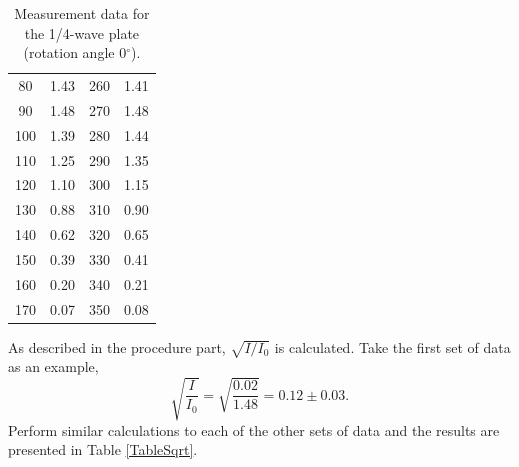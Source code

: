 \documentclass[a4paper]{article}
\begin{document}
\begin{table}[H]
\begin{tabular}{cc||cc}
		80                                                 & 1.43                                           & 260                                & 1.41                                           \\
		90                                                 & 1.48                                           & 270                                & 1.48                                           \\
		100                                                & 1.39                                           & 280                                & 1.44                                           \\
		110                                                & 1.25                                           & 290                                & 1.35                                           \\
		120                                                & 1.10                                           & 300                                & 1.15                                           \\
		130                                                & 0.88                                           & 310                                & 0.90                                           \\
		140                                                & 0.62                                           & 320                                & 0.65                                           \\
		150                                                & 0.39                                           & 330                                & 0.41                                           \\
		160                                                & 0.20                                           & 340                                & 0.21                                           \\
		170                                                & 0.07                                           & 350                                & 0.08                                           \\
		\hline
	\end{tabular}
	\caption{Measurement data for the 1/4-wave plate (rotation angle 0$^\circ$).}
	\label{table::1/4,0}
\end{table}

As described in the procedure part, $\sqrt{I/I_0}$ is calculated. Take the first set of data as an example,
$$\sqrt{\frac{I}{I_0}} = \sqrt{\frac{0.02}{1.48}} = 0.12 \pm 0.03.$$
Perform similar calculations to each of the other sets of data and the results are presented in Table \ref{TableSqrt}.
\end{document}
